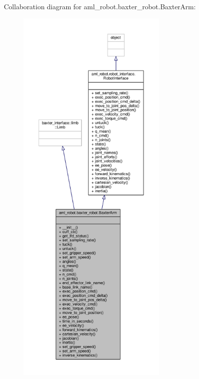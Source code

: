 Collaboration diagram for aml\-\_\-robot.\-baxter\-\_\-robot.\-Baxter\-Arm\-:
\nopagebreak
\begin{figure}[H]
\begin{center}
\leavevmode
\includegraphics[height=550pt]{classaml__robot_1_1baxter__robot_1_1_baxter_arm__coll__graph}
\end{center}
\end{figure}
